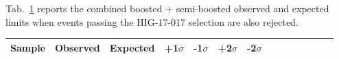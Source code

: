 
Tab.~\ref{tab:limNoRes} reports the combined boosted + semi-boosted observed and expected limits when events passing the HIG-17-017 selection are also rejected.

\begin{table}[h]
\label{tab:limNoRes}
\begin{tabular}{|l|c|c|c|c|c|c|c|c|c|c|c|c|c|}
\hline
Sample & Observed & Expected & +1$\sigma$ & -1$\sigma$ & +2$\sigma$ & -2$\sigma$ \\ \hline
\hline

\end{tabular}
\end{table}
